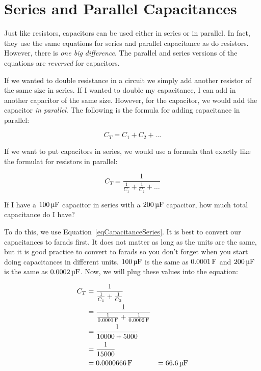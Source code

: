 \section{Series and Parallel Capacitances}

Just like resistors, capacitors can be used either in series or in parallel.
In fact, they use the same equations for series and parallel capacitance as do resistors.
However, there is \emph{one big difference}.  
The parallel and series versions of the equations are \emph{reversed} for capacitors.

If we wanted to double resistance in a circuit we simply add another resistor of the same size in series.
If I wanted to double my capacitance, I can add in another capacitor of the same size.
However, for the capacitor, we would add the capacitor \emph{in parallel}.
The following is the formula for adding capacitance in parallel:

\begin{equation}
\label{eqCapacitanceParallel}
C_T = C_1 + C_2 + \ldots
\end{equation}

If we want to put capacitors in series, we would use a formula that exactly like the formulat for resistors in parallel:

\begin{equation}
\label{eqCapacitanceSeries}
C_T = \frac{1}{\frac{1}{C_1} + \frac{1}{C_2} + \ldots}
\end{equation}

\begin{exampleprob}
If I have a $100\,\si{\micro\farad}$ capacitor in series with a $200\,\si{\micro\farad}$ capacitor, how much total capacitance do I have?

To do this, we use Equation~\ref{eqCapacitanceSeries}.
It is best to convert our capacitances to farads first.
It does not matter as long as the units are the same, but it is good practice to convert to farads so you don't forget when you start doing capacitances in different units.
$100\,\si{\micro\farad}$ is the same as $0.0001\,\si{\farad}$ and $200\,\si{\micro\farad}$ is the same as $0.0002\,\si{\micro\farad}$.
Now, we will plug these values into the equation:

\begin{align*}
C_T &= \frac{1}{\frac{1}{C_1} + \frac{1}{C_2}} \\
    &= \frac{1}{\frac{1}{0.0001\,\si{\farad}} + \frac{1}{0.0002\,\si{\farad}}} \\
    &= \frac{1}{10000 + 5000} \\
    &= \frac{1}{15000} \\
    &= 0.0000666\,\si{\farad}
    &= 66.6\,\si{\micro\farad}
\end{align*}
\end{exampleprob}

